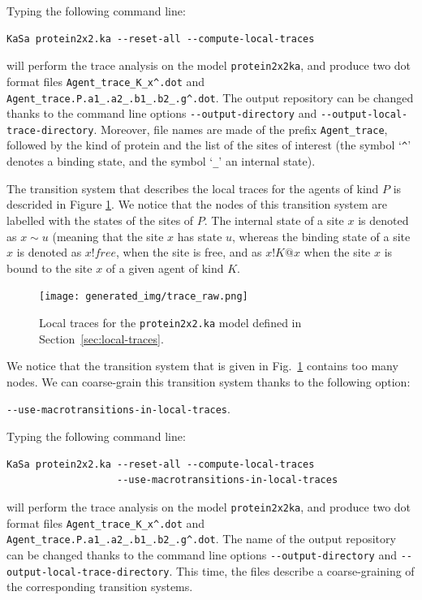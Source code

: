 \documentclass[11pt]{book}
\def\ttt#1{\texttt{#1}}
\begin{document}
Typing the following command line:

\begin{verbatim}
KaSa protein2x2.ka --reset-all --compute-local-traces
\end{verbatim}

will perform the trace analysis on the model \texttt{protein2x2ka}, and produce
two dot format files \texttt{Agent\_trace\_K\_x\string^.dot} and \texttt{Agent\_trace.P.a1\_.a2\_.b1\_.b2\_.g\string^.dot}. The  output repository can be changed thanks to the command line options \texttt{-{}-output-directory} and \texttt{-{}-output-local-trace-directory}. Moreover, file names are made of the prefix \texttt{Agent\_trace}, followed by  the kind of protein and the list of the sites of interest (the symbol `\texttt{\string^}' denotes a binding state, and the symbol `\texttt{\_}' an internal state).

The transition system that describes the local traces for the agents of kind $P$ is descrided in Figure \ref{fig:trace-raw}. We notice that the nodes of this transition system are labelled with the states of the sites of $P$. The internal state of a site $x$ is denoted as $x{\sim}u$ (meaning that the site $x$ has state $u$, whereas the binding state of a site $x$ is denoted as $x!\textit{free}$, when the site is free, and as $x!K@x$ when the site $x$ is bound to the site $x$ of a given agent of kind $K$.

\begin{figure}[htbp]
\centering
\texttt{[image: generated\_img/trace\_raw.png]}
\caption{Local traces for the \ttt{protein2x2.ka} model defined in Section~\ref{sec:local-traces}.}
\label{fig:trace-raw}
\end{figure}

We notice that the transition system that is given in Fig.~\ref{fig:trace-raw}  contains too many nodes. We can coarse-grain this transition system thanks to the following option:
\begin{center}
\texttt{-{}-use-macrotransitions-in-local-traces}.
\end{center}
Typing the following command line:

\begin{verbatim}
KaSa protein2x2.ka --reset-all --compute-local-traces
                   --use-macrotransitions-in-local-traces
\end{verbatim}

will perform the trace analysis on the model \texttt{protein2x2ka}, and produce
two dot format files \texttt{Agent\_trace\_K\_x\string^.dot} and \texttt{Agent\_trace.P.a1\_.a2\_.b1\_.b2\_.g\string^.dot}. The name of the output repository can be changed thanks to the command line options \texttt{-{}-output-directory} and \texttt{-{}-output-local-trace-directory}.
This time, the files describe a coarse-graining of the corresponding transition systems.
\end{document}
